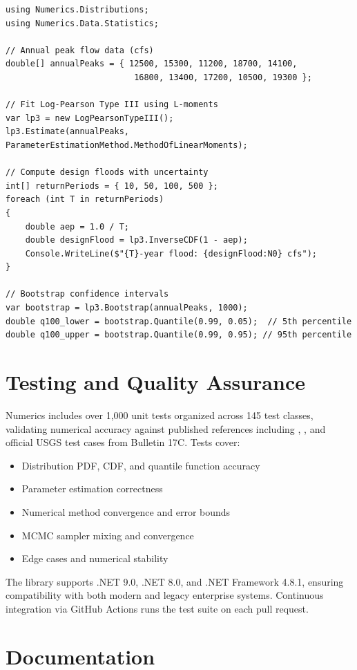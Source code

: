 \documentclass[10pt,a4paper,onecolumn]{article}
\begin{document}
\begin{verbatim}
using Numerics.Distributions;
using Numerics.Data.Statistics;

// Annual peak flow data (cfs)
double[] annualPeaks = { 12500, 15300, 11200, 18700, 14100,
                          16800, 13400, 17200, 10500, 19300 };

// Fit Log-Pearson Type III using L-moments
var lp3 = new LogPearsonTypeIII();
lp3.Estimate(annualPeaks, ParameterEstimationMethod.MethodOfLinearMoments);

// Compute design floods with uncertainty
int[] returnPeriods = { 10, 50, 100, 500 };
foreach (int T in returnPeriods)
{
    double aep = 1.0 / T;
    double designFlood = lp3.InverseCDF(1 - aep);
    Console.WriteLine($"{T}-year flood: {designFlood:N0} cfs");
}

// Bootstrap confidence intervals
var bootstrap = lp3.Bootstrap(annualPeaks, 1000);
double q100_lower = bootstrap.Quantile(0.99, 0.05);  // 5th percentile
double q100_upper = bootstrap.Quantile(0.99, 0.95); // 95th percentile
\end{verbatim}

\section*{Testing and Quality Assurance}

Numerics includes over 1,000 unit tests organized across 145 test classes, validating numerical accuracy against published references including \citet{press2007}, \citet{rao2000}, and official USGS test cases from Bulletin 17C. Tests cover:

\begin{itemize}
    \item Distribution PDF, CDF, and quantile function accuracy
    \item Parameter estimation correctness
    \item Numerical method convergence and error bounds
    \item MCMC sampler mixing and convergence
    \item Edge cases and numerical stability
\end{itemize}

The library supports .NET 9.0, .NET 8.0, and .NET Framework 4.8.1, ensuring compatibility with both modern and legacy enterprise systems. Continuous integration via GitHub Actions runs the test suite on each pull request.

\section*{Documentation}
\end{document}
